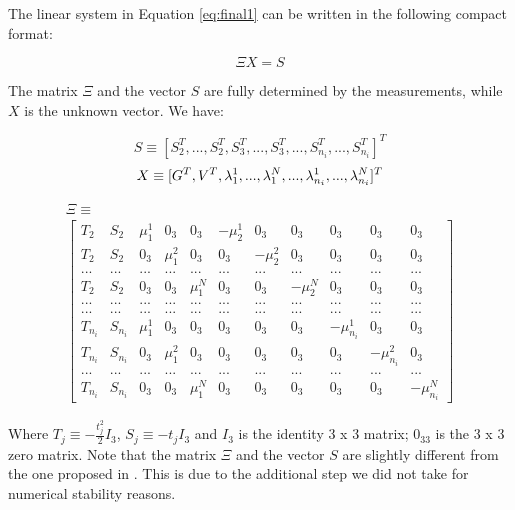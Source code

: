 \documentclass[letterpaper, 10 pt, conference]{ieeeconf}  %
\begin{document}
The linear system in Equation \ref{eq:final1} can be written in the following compact format:

\begin{equation}
\label{eq:mat1} \tag{9}
\Xi X = S
\end{equation}

The matrix $\Xi$ and the vector $S$ are fully determined by the measurements, while $X$ is the unknown vector.
We have:

\[
S \equiv [S_2^T, ...,S_2^T, S_3^T,...,S_3^T,...,S_{n_i}^T,...,S_{n_i}^T]^T
\]
\[
X \equiv [ G^T, V^T, \lambda_1^1, ..., \lambda_1^N, ..., \lambda_{n_i}^1, ..., \lambda_{n_i}^N]^T \\
\]

\begin{multline}
  \Xi \equiv \\
  \left[
    {\scriptscriptstyle
    \begin{array}{l|l|l|l|l|l|l|l|l|l|l}
      T_2 & S_2 & \mu_1^1 & 0_3 & 0_3 & -\mu_2^1 & 0_3 & 0_3 & 0_3 & 0_3 & 0_3 \\
      T_2 & S_2 & 0_3 & \mu_1^2 & 0_3 & 0_3 & -\mu_2^2 & 0_3 & 0_3 & 0_3 & 0_3 \\
      ... & ... & ... & ... & ... & ... & ... & ... & ... & ... & ... \\
      T_2 & S_2 & 0_3 & 0_3 & \mu_1^N & 0_3 & 0_3 & -\mu_2^N & 0_3 & 0_3 & 0_3 \\
      ... & ... & ... & ... & ... & ... & ... & ... & ... & ... & ... \\
      ... & ... & ... & ... & ... & ... & ... & ... & ... & ... & ... \\
      T_{n_i} & S_{n_i} & \mu_1^1 & 0_3 & 0_3 & 0_3 & 0_3 & 0_3 & -\mu_{n_i}^1 & 0_3 & 0_3 \\
      T_{n_i} & S_{n_i} & 0_3 & \mu_1^2 & 0_3 & 0_3 & 0_3 & 0_3 & 0_3 & -\mu_{n_i}^2 & 0_3 \\
      ... & ... & ... & ... & ... & ... & ... & ... & ... & ... & ... \\
      T_{n_i} & S_{n_i} & 0_3 & 0_3 & \mu_1^N & 0_3 & 0_3 & 0_3 & 0_3 & 0_3 & -\mu_{n_i}^N
    \end{array}
    }
    \right]
\end{multline}

Where $T_j \equiv - \frac{t^2_j}{2} I_3$, $S_j \equiv -t_j I_3$ and $I_3$ is the identity 3 x 3 matrix; $0_{33}$ is the 3 x 3 zero matrix.
Note that the matrix $\Xi$ and the vector $S$ are slightly different from the one proposed in \cite{Martinelli2014}.
This is due to the additional step we did not take for numerical stability reasons.
\end{document}
